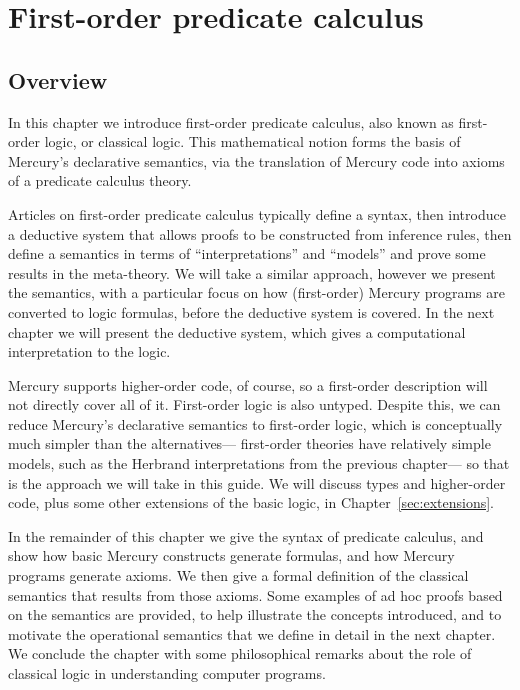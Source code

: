 \chapter{First-order predicate calculus}
\label{sec:fopc}

\section{Overview}

In this chapter we introduce first-order predicate calculus,
also known as first-order logic, or classical logic.
This mathematical notion
forms the basis of Mercury's declarative semantics,
via the translation of Mercury code
into axioms of a predicate calculus theory.

Articles on first-order predicate calculus
typically define a syntax,
then introduce a deductive system that allows proofs to be constructed
from inference rules,
then define a semantics in terms of ``interpretations'' and ``models''
and prove some results in the meta-theory.
We will take a similar approach,
however we present the semantics,
with a particular focus on how (first-order) Mercury programs
are converted to logic formulas,
before the deductive system is covered.
In the next chapter we will present the deductive system,
which gives a computational interpretation to the logic.

Mercury supports higher-order code, of course,
so a first-order description will not directly cover all of it.
First-order logic is also untyped.
Despite this,
we can reduce Mercury's declarative semantics to first-order logic,
which is conceptually much simpler than the alternatives---%
first-order theories have relatively simple models,
such as the Herbrand interpretations from the previous chapter---%
so that is the approach we will take in this guide.
We will discuss types and higher-order code,
plus some other extensions of the basic logic,
in Chapter~\ref{sec:extensions}.

In the remainder of this chapter
we give the syntax of predicate calculus,
and show how basic Mercury constructs generate formulas,
and how Mercury programs generate axioms.
We then give a formal definition of the classical semantics
that results from those axioms.
Some examples of ad hoc proofs based on the semantics are provided,
to help illustrate the concepts introduced,
and to motivate the operational semantics
that we define in detail in the next chapter.
We conclude the chapter with some philosophical remarks about
the role of classical logic in understanding computer programs.


